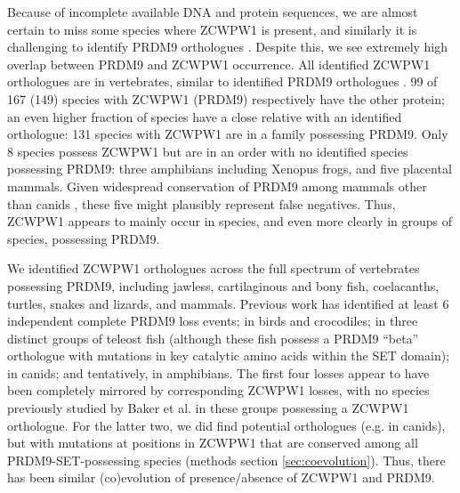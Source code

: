 Because of incomplete available DNA and protein sequences, we are almost certain to miss some species where ZCWPW1 is present, and similarly it is challenging to identify PRDM9 orthologues \parencite{Baker2017Repeated}. Despite this, we see extremely high overlap between PRDM9 and ZCWPW1 occurrence. All identified ZCWPW1 orthologues are in vertebrates, similar to identified PRDM9 orthologues \parencite{Baker2017Repeated}. 99 of 167 (149) species with ZCWPW1 (PRDM9) respectively have the other protein; an even higher fraction of species have a close relative with an identified orthologue: 131 species with ZCWPW1 are in a family possessing PRDM9. Only 8 species possess ZCWPW1 but are in an order with no identified species possessing PRDM9: three amphibians including Xenopus frogs, and five placental mammals. Given widespread conservation of PRDM9 among mammals other than canids \parencite{Baker2017Repeated}, these five might plausibly represent false negatives. Thus, ZCWPW1 appears to mainly occur in species, and even more clearly in groups of species, possessing PRDM9.

We identified ZCWPW1 orthologues across the full spectrum of vertebrates possessing PRDM9, including jawless, cartilaginous and bony fish, coelacanths, turtles, snakes and lizards, and mammals. Previous work \parencite{Baker2017Repeated} has identified at least 6 independent complete PRDM9 loss events; in birds and crocodiles; in three distinct groups of teleost fish (although these fish possess a PRDM9 “beta” orthologue with mutations in key catalytic amino acids within the SET domain); in canids; and tentatively, in amphibians. The first four losses appear to have been completely mirrored by corresponding ZCWPW1 losses, with no species previously studied by Baker et al. in these groups possessing a ZCWPW1 orthologue. For the latter two, we did find potential orthologues (e.g. in canids), but with mutations at positions in ZCWPW1 that are conserved among all PRDM9-SET-possessing species (methods section \ref{sec:coevolution}). Thus, there has been similar (co)evolution of presence/absence of ZCWPW1 and PRDM9.

